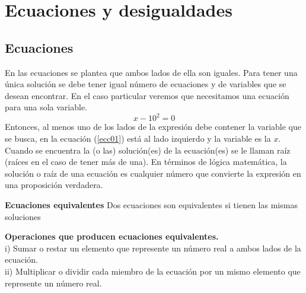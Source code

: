 \chapter{Ecuaciones y desigualdades}
\label{EyD}

\section{Ecuaciones}
\label{ecc0}

En las ecuaciones se plantea que ambos lados de ella son iguales. Para tener una única solución se debe tener igual número de ecuaciones y de variables que se desean encontrar. En el caso particular veremos que necesitamos una ecuación para una sola variable.\\
\begin{equation}
x-10^{2}=0 \label{ecc01}
\end{equation} 
Entonces, al menos uno de los lados de la expresión debe contener la variable que se busca, en la ecuación (\ref{ecc01}) está al lado izquierdo y la variable es la $x$. Cuando se encuentra la (o las) solución(es) de la ecuación(es) se le llaman raíz (raíces en el caso de tener más de una). En términos de lógica matemática, la solución o raíz de una ecuación es cualquier número que convierte la expresión en una proposición verdadera.\\

\begin{mydef}
\textbf{Ecuaciones equivalentes} Dos ecuaciones son equivalentes si tienen las mismas soluciones
\end{mydef} 

\begin{mydef}
\textbf{Operaciones que producen ecuaciones equivalentes. }\\
\noindent i) Sumar o restar un elemento que represente un número real a ambos lados de la ecuación. \\
\noindent ii) Multiplicar o dividir cada miembro de la ecuación por un mismo elemento que represente un número real.\\
\end{mydef} 

